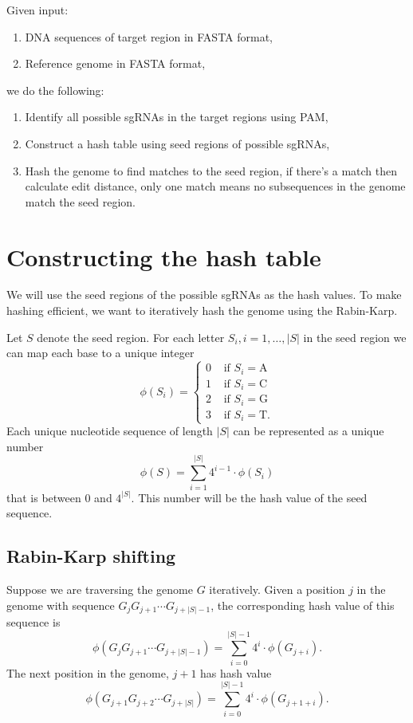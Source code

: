 \documentclass{article}[12pt]
\begin{document}
Given input:
\begin{enumerate}
\item DNA sequences of target region in FASTA format,
\item Reference genome in FASTA format,
\end{enumerate}
we do the following:
\begin{enumerate}
\item Identify all possible sgRNAs in the target regions using 
PAM,
\item Construct a hash table using seed regions of possible sgRNAs,
\item Hash the genome to find matches to the seed region, if there's a 
match then calculate edit distance, only one match means
no subsequences in the genome match the seed region.
\end{enumerate}

\section*{Constructing the hash table}


We will use the seed regions of the possible sgRNAs
as the hash values.  To make hashing efficient, we
want to iteratively hash the genome using the Rabin-Karp.  

Let $S$ denote the seed region.  For each
letter $S_{i}, i = 1, \ldots, |S|$ in the seed region
we can map each base to a unique integer
\[
\phi(S_{i}) = \begin{cases}
0 & \text{ if } S_{i} = \text{A} \\
1 & \text{ if } S_{i} = \text{C} \\
2 & \text{ if } S_{i} = \text{G} \\
3 & \text{ if } S_{i} = \text{T}.
\end{cases}
\]
Each unique nucleotide sequence of length $|S|$
can be represented as a unique number
\begin{equation} \label{string2num}
\phi(S) = \sum_{i = 1}^{|S|} 4^{i-1} \cdot \phi(S_{i})
\end{equation}
that is between $0$ and $4^{|S|}$.  This number
will be the hash value of the seed sequence.

\subsection*{Rabin-Karp shifting}

Suppose we are traversing the genome $G$ iteratively.
Given a position $j$ in the genome with sequence
$G_{j} G_{j+1} \cdots G_{j + |S| - 1}$, the corresponding
hash value of this sequence is 
\[
\phi(G_{j} G_{j+1} \cdots G_{j + |S| - 1}) = \sum_{i = 0}^{|S| - 1} 4^{i} \cdot \phi(G_{j + i}).
\]
The next position in the genome, $j + 1$ has hash value 
\[
\phi(G_{j + 1} G_{j+2} \cdots G_{j + |S|} ) = \sum_{i = 0}^{|S| -1} 4^{i} \cdot \phi(G_{j + 1 + i}).
\]
\end{document}
